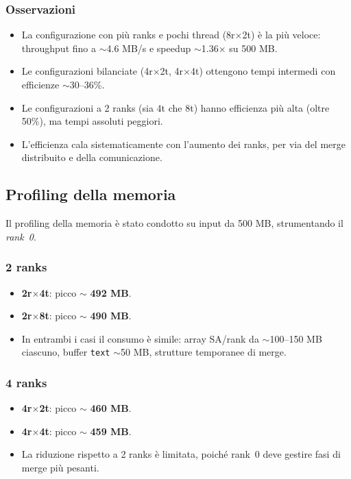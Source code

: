 			\subsubsection*{Osservazioni}
				\begin{itemize}
						\item La configurazione con più ranks e pochi thread (8r$\times$2t) è la più veloce: throughput fino a $\sim$4.6 MB/s e speedup $\sim$1.36$\times$ su 500 MB.
						\item Le configurazioni bilanciate (4r$\times$2t, 4r$\times$4t) ottengono tempi intermedi con efficienze $\sim$30–36\%.
						\item Le configurazioni a 2 ranks (sia 4t che 8t) hanno efficienza più alta (oltre 50\%), ma tempi assoluti peggiori.
						\item L’efficienza cala sistematicamente con l’aumento dei ranks, per via del merge distribuito e della comunicazione.
				\end{itemize}
		
		\subsection{Profiling della memoria}
			Il profiling della memoria è stato condotto su input da 500 MB, strumentando il \emph{rank~0}.
			
			\subsubsection{2 ranks}
				\begin{itemize}
						\item \textbf{2r$\times$4t}: picco $\sim$ \textbf{492 MB}.
						\item \textbf{2r$\times$8t}: picco $\sim$ \textbf{490 MB}.
						\item In entrambi i casi il consumo è simile: array SA/rank da $\sim$100–150 MB ciascuno, buffer \texttt{text} $\sim$50 MB, strutture temporanee di merge.
				\end{itemize}
			
			\subsubsection{4 ranks}
				\begin{itemize}
						\item \textbf{4r$\times$2t}: picco $\sim$ \textbf{460 MB}.
						\item \textbf{4r$\times$4t}: picco $\sim$ \textbf{459 MB}.
						\item La riduzione rispetto a 2 ranks è limitata, poiché rank~0 deve gestire fasi di merge più pesanti.
				\end{itemize}
			
